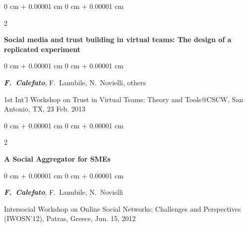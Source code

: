 \documentclass[10pt, a4paper]{article}
\newenvironment{onecolentry}{
    \begin{adjustwidth}{
        0 cm + 0.00001 cm
    }{
        0 cm + 0.00001 cm
    }
}{
    \end{adjustwidth}
} %
\newenvironment{twocolentry}[2][]{
    \onecolentry
    \def\secondColumn{#2}
    \setcolumnwidth{\fill, 4.5 cm}
    \begin{paracol}{2}
}{
    \switchcolumn \raggedleft \secondColumn
    \end{paracol}
    \endonecolentry
} %
\begin{document}
        \begin{samepage}
            \begin{twocolentry}{
                2013
            }
                \textbf{Social media and trust building in virtual teams: The design of a replicated experiment}
            \end{twocolentry}

            \vspace{0.10 cm}
            
            \begin{onecolentry}
                \mbox{\textbf{\textit{F. Calefato}}}, \mbox{F. Lanubile}, \mbox{N. Novielli}, \mbox{others}

                \vspace{0.10 cm}
                
        1st Int’l Workshop on Trust in Virtual Teams: Theory and Tools@CSCW, San Antonio, TX, 23 Feb. 2013\end{onecolentry}
        \end{samepage}

        \vspace{0.2 cm}

        \begin{samepage}
            \begin{twocolentry}{
                2012
            }
                \textbf{A Social Aggregator for SMEs}
            \end{twocolentry}

            \vspace{0.10 cm}
            
            \begin{onecolentry}
                \mbox{\textbf{\textit{F. Calefato}}}, \mbox{F. Lanubile}, \mbox{N. Novielli}

                \vspace{0.10 cm}
                
        Intersocial Workshop on Online Social Networks: Challenges and Perspectives (IWOSN'12), Patras, Greece, Jun. 15, 2012\end{onecolentry}
        \end{samepage}

        \vspace{0.2 cm}
\end{document}
